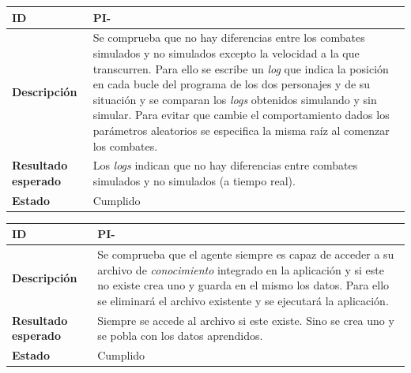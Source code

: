 \begin{center}
	\begin{tabular}{ | p{3cm} | p{10cm} | } 
		\hline
		
		\textbf{ID} & PI-\arabic{contador_pruebas_integracion}
		{contador_pruebas_integracion} \\
		
		\hline
		\textbf{Descripción} & 
		Se comprueba que no hay diferencias entre los combates simulados y no simulados excepto la velocidad a la que transcurren. Para ello se escribe un \textit{log} que indica la posición en cada bucle del programa de los dos personajes y de su situación y se comparan los \textit{logs} obtenidos simulando y sin simular. Para evitar que cambie el comportamiento dados los parámetros aleatorios se especifica la misma raíz al comenzar los combates.\\
		
		\hline 
		\textbf{Resultado esperado} &
		Los \textit{logs} indican que no hay diferencias entre combates simulados y no simulados (a tiempo real).\\ 
		
		\hline 
		\textbf{Estado} &
		Cumplido\\ 
		
		\hline
	\end{tabular}
\end{center}

\begin{center}
	\begin{tabular}{ | p{3cm} | p{10cm} | } 
		\hline
		
		\textbf{ID} & PI-\arabic{contador_pruebas_integracion}
		{contador_pruebas_integracion} \\
		
		\hline
		\textbf{Descripción} & 
		Se comprueba que el agente siempre es capaz de acceder a su archivo de \textit{conocimiento} integrado en la aplicación y si este no existe crea uno y guarda en el mismo los datos. Para ello se eliminará el archivo existente y se ejecutará la aplicación.\\
		
		\hline 
		\textbf{Resultado esperado} &
		Siempre se accede al archivo si este existe. Sino se crea uno y se pobla con los datos aprendidos.\\
		
		\hline 
		\textbf{Estado} &
		Cumplido\\ 
		
		\hline
	\end{tabular}
\end{center}

